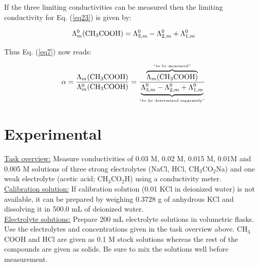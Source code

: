 \documentclass[byrevtex,amssymb,aps,pra,floatfix,letterpaper]{revtex4}
\begin{document}
\noindent
If the three limiting conductivities can be measured then the limiting conductivity for Eq. (\ref{eq23}) is given by:

\begin{equation}
\Lambda_m^0(\textnormal{CH}_3\textnormal{COOH}) = \Lambda_{3,m}^0 - \Lambda_{2,m}^0 + \Lambda_{1,m}^0
\label{eq25}
\end{equation}

\noindent
Thus Eq. (\ref{eq7}) now reads:

\begin{equation}
\alpha = \frac{\Lambda_m(\textnormal{CH}_3\textnormal{COOH})}{\Lambda_m^0(\textnormal{CH}_3\textnormal{COOH})} = \frac{\overbrace{\Lambda_m(\textnormal{CH}_3\textnormal{COOH})}^{\textnormal{\tiny ``to be measured''}}}{\underbrace{\Lambda_{3,m}^0 - \Lambda_{2,m}^0 + \Lambda_{1,m}^0}_{\textnormal{\tiny ``to be determined separately''}}}
\label{eq26}
\end{equation}

\section{Experimental}

\noindent
\underline{Task overview:} Measure conductivities of 0.03 M, 0.02 M, 0.015 M, 0.01M and 0.005 M solutions of three strong electrolytes (NaCl, HCl, CH$_3$CO$_2$Na) and one weak electrolyte (acetic acid; CH$_3$CO$_2$H) using a conductivity meter.\\

\noindent
\underline{Calibration solution:} If calibration solution (0.01 KCl in deionized water) is not available, it can be prepared by weighing 0.3728 g of anhydrous KCl and dissolving it in 500.0 mL of deionized water.\\

\noindent
\underline{Electrolyte solutions:} Prepare 200 mL electrolyte solutions in volumetric flasks. Use the electrolytes and concentrations given in the task overview above. CH$_3$COOH and HCl are given as 0.1 M stock solutions whereas the rest of the compounds are given as solids. Be sure to mix the solutions well before measurement.\\
\end{document}
